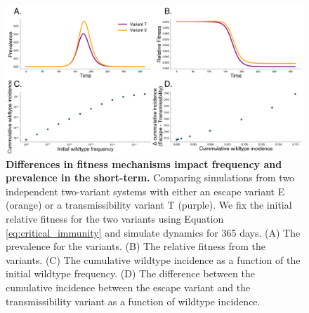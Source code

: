 \documentclass[11pt,oneside,letterpaper]{article}
\begin{document}
\begin{figure}[h]
    \centering
    \includegraphics[width=1.0\linewidth]{./supplementary_figures/short_term_divergence.png}
    \caption{
      \textbf{Differences in fitness mechanisms impact frequency and prevalence in the short-term.}
      Comparing simulations from two independent two-variant systems with either an escape variant E (orange) or a transmissibility variant T (purple).
      We fix the initial relative fitness for the two variants using Equation \ref{eq:critical_immunity} and simulate dynamics for 365 days.
      (A) The prevalence for the variants.
      (B) The relative fitness from the variants.
      (C) The cumulative wildtype incidence as a function of the initial wildtype frequency.
      (D) The difference between the cumulative incidence between the escape variant and the transmissibility variant as a function of wildtype incidence.
    }
    \label{fig:short_term_divergence}
\end{figure}
\end{document}
